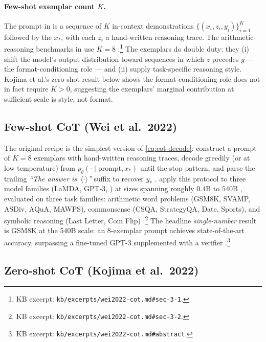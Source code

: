 \paragraph{Few-shot exemplar count $K$.} The  prompt in
\citet{wei2022-cot} is a sequence of $K$ in-context demonstrations
$\{(x_i, z_i, y_i)\}_{i=1}^K$ followed by the  $x_*$, with each
$z_i$ a hand-written reasoning trace. The arithmetic-reasoning
benchmarks in \citet{wei2022-cot} use $K = 8$
\citep[\S 3.1]{wei2022-cot}.\footnote{KB excerpt:
\nolinkurl{kb/excerpts/wei2022-cot.md#sec-3-1}.} The exemplars do double
duty: they (i) shift the model's output distribution toward sequences
in which $z$ precedes $y$ — the format-conditioning role — and
(ii) supply task-specific reasoning style. Kojima et al.'s zero-shot
result below shows the format-conditioning role does not in fact
require $K > 0$, suggesting the exemplars' marginal contribution at
sufficient scale is style, not format.

\subsection{Few-shot CoT (Wei et al.\ 2022)}
\label{sec:cot-fewshot}

The original recipe is the simplest version of \cref{eq:cot-decode}:
construct a prompt of $K = 8$ exemplars with hand-written reasoning
traces, decode greedily (or at low temperature) from $p_\theta(\cdot
\mid \text{prompt}, x_*)$ until the stop pattern, and parse the
trailing \emph{``The answer is~$\langle\cdot\rangle$''} suffix to
recover $y_*$ \citep[\S 3.1]{wei2022-cot}. \citet{wei2022-cot} apply
this protocol to three model families (LaMDA, GPT-3, ) at sizes
spanning roughly $0.4\text{B}$ to $540\text{B}$ , evaluated
on three task families: arithmetic word problems (GSM8K, SVAMP, ASDiv,
AQuA, MAWPS), commonsense (CSQA, StrategyQA, Date, Sports), and
symbolic reasoning (Last Letter, Coin Flip)
\citep[\S 3.2]{wei2022-cot}.\footnote{KB excerpt:
\nolinkurl{kb/excerpts/wei2022-cot.md#sec-3-2}.} The headline
\emph{single-number} result is GSM8K at the 540B scale: an 8-exemplar
 prompt achieves state-of-the-art accuracy, surpassing a fine-tuned
GPT-3 supplemented with a verifier
\citep[abstract]{wei2022-cot}.\footnote{KB excerpt:
\nolinkurl{kb/excerpts/wei2022-cot.md#abstract}.}

\subsection{Zero-shot CoT (Kojima et al.\ 2022)}
\label{sec:cot-zeroshot}

